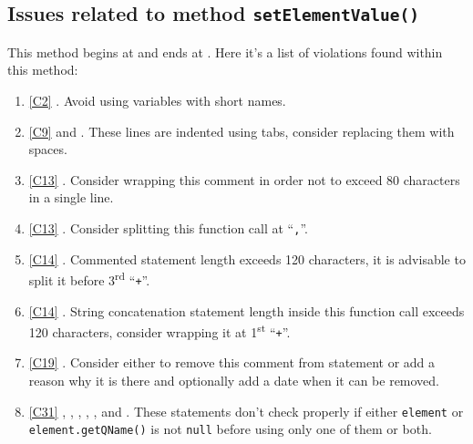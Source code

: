 \subsection{Issues related to method \texttt{setElementValue()}}
This method begins at  and ends at . Here it's a list of violations found within this method:
\begin{enumerate}
	\item \ref{C2} . Avoid using variables with short names.
	\item \ref{C9}  and . These lines are indented using tabs, consider replacing them with spaces.
	\item \ref{C13} . Consider wrapping this comment in order not to exceed 80 characters in a single line.
	\item \ref{C13} . Consider splitting this function call at ``\texttt{,}''.
	\item \ref{C14} . Commented statement length exceeds 120 characters, it is advisable to split it before 3\textsuperscript{rd} ``\texttt{+}''.
	\item \ref{C14} . String concatenation statement length inside this function call exceeds 120 characters, consider wrapping it at 1\textsuperscript{st} ``\texttt{+}''.
	\item \ref{C19} . Consider either to remove this comment from statement or add a reason why it is there and optionally add a date when it can be removed.
	\item \ref{C31} , , , , ,  and . These statements don't check properly if either \texttt{element} or \texttt{element.getQName()} is not \texttt{null} before using only one of them or both.

\end{enumerate}
